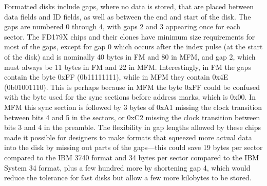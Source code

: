 \documentclass[a4paper]{article}
\begin{document}
Formatted disks include gaps, where no data is stored, that are placed
between data fields and ID fields, as well as between the end and
start of the disk. The gaps are numbered 0 through 4, with gaps 2 and
3 appearing once for each sector. The FD179X chips and their clones
have minimum size requirements for most of the gaps, except for gap 0
which occurs after the index pulse (at the start of the disk) and is
nominally 40 bytes in FM and 80 in MFM, and gap 2, which must always
be 11 bytes in FM and 22 in MFM. Interestingly, in FM the gaps contain
the byte 0xFF (0b11111111), while in MFM they contain 0x4E
(0b01001110). This is perhaps because in MFM the byte 0xFF could be
confused with the byte used for the sync sections before address marks, which is
0x00. In MFM this sync section is followed by 3 bytes of 0xA1 missing
the clock transition between bits 4 and 5 in the sectors, or 0xC2
missing the clock transition between bits 3 and 4 in the preamble. The
flexibility in gap lengths allowed by these chips made it possible for
designers to make formats that squeezed more actual data into the disk
by missing out parts of the gaps---this could save 19 bytes per sector
compared to the IBM 3740 format and 34 bytes per sector compared to
the IBM System 34 format, plus a few hundred more by shortening gap 4,
which would reduce the tolerance for fast disks but allow a few more
kilobytes to be stored.
\end{document}
